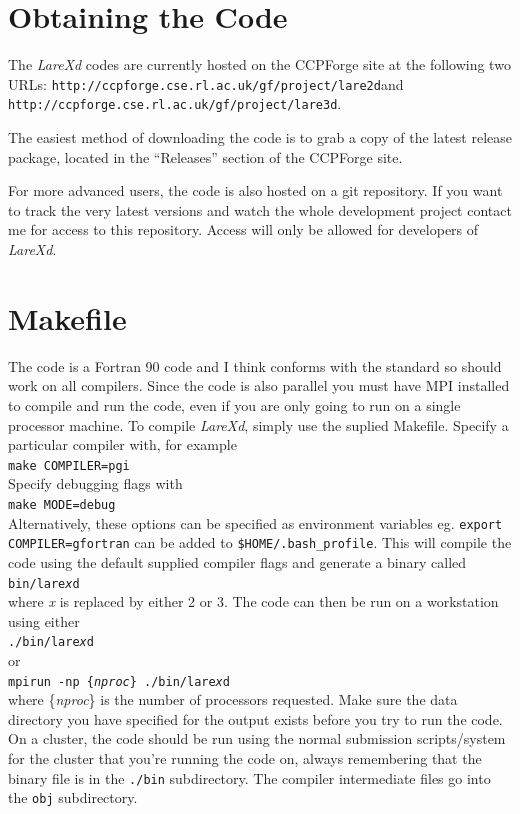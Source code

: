 \documentclass[11pt]{article}
\begin{document}
\section{Obtaining the Code}
The {\it LareXd} codes are currently hosted on the CCPForge site at
the following two URLs:\linebreak
{\tt http://ccpforge.cse.rl.ac.uk/gf/project/lare2d}\linebreak and
{\tt http://ccpforge.cse.rl.ac.uk/gf/project/lare3d}.

The easiest method of downloading the code is to grab a copy of the latest
release package, located in the ``Releases'' section of the CCPForge site.

For more advanced users, the code is also hosted on a git repository. If you want to track the very
latest versions and watch the whole development project contact me for access to this repository.
Access will only be allowed for developers of {\it LareXd}.

\section{Makefile}

The code is a Fortran 90 code and I think conforms with the standard so should work on all compilers. Since the code is also parallel you must have MPI installed to compile and run the code, even if you are only going to run on a single processor machine.
To compile {\it LareXd}, simply use the suplied Makefile. Specify a particular compiler with, for example \\
\texttt{make COMPILER=pgi}\\
Specify debugging flags with\\ 
\texttt{make MODE=debug}\\
Alternatively, these options can be specified as environment variables
eg. \texttt{export COMPILER=gfortran} can be added to \texttt{\$HOME/.bash\_profile}.
This will compile the code using the default supplied compiler flags and generate a binary called\\
\texttt{bin/lare{\it x}d}\\
where {\it x} is replaced by either 2 or 3. The code can then be run on a workstation using either\\
\texttt{./bin/lare{\it x}d}\\
or\\
\texttt{mpirun -np \{{\it nproc}\} ./bin/lare{\it x}d}\\
where \{{\it nproc}\} is the number of processors requested. Make sure the data directory you have specified for the output exists
before you try to run the code. On a cluster, the
code should be run using the normal submission scripts/system for the cluster
that you're running the code on, always remembering that the binary file is in
the \texttt{./bin} subdirectory. The compiler intermediate files go into the
\texttt{obj} subdirectory. \\
\end{document}
